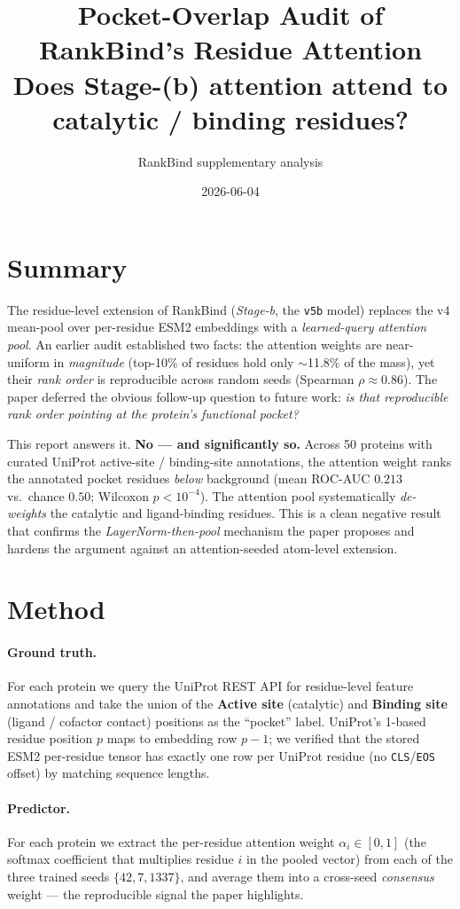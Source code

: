 \documentclass[11pt]{article}
\title{\textbf{Pocket-Overlap Audit of RankBind's Residue Attention}\\[2pt]
\large Does Stage-(b) attention attend to catalytic / binding residues?}
\author{RankBind supplementary analysis}
\date{2026-06-04}
\begin{document}
\maketitle

\section*{Summary}

The residue-level extension of RankBind (\emph{Stage-b}, the \texttt{v5b}
model) replaces the v4 mean-pool over per-residue ESM2 embeddings with a
\emph{learned-query attention pool}. An earlier audit established two facts:
the attention weights are near-uniform in \emph{magnitude} (top-10\% of
residues hold only $\sim$11.8\% of the mass), yet their \emph{rank order} is
reproducible across random seeds (Spearman $\rho \approx 0.86$). The paper
deferred the obvious follow-up question to future work:
\emph{is that reproducible rank order pointing at the protein's functional
pocket?}

This report answers it. \textbf{No --- and significantly so.} Across 50
proteins with curated UniProt active-site / binding-site annotations, the
attention weight ranks the annotated pocket residues \emph{below} background
(mean ROC-AUC $0.213$ vs.\ chance $0.50$; Wilcoxon $p < 10^{-4}$). The
attention pool systematically \emph{de-weights} the catalytic and
ligand-binding residues. This is a clean negative result that confirms the
\emph{LayerNorm-then-pool} mechanism the paper proposes and hardens the
argument against an attention-seeded atom-level extension.

\section{Method}

\paragraph{Ground truth.} For each protein we query the UniProt REST API for
residue-level feature annotations and take the union of the
\textbf{Active site} (catalytic) and \textbf{Binding site}
(ligand / cofactor contact) positions as the ``pocket'' label. UniProt's
1-based residue position $p$ maps to embedding row $p-1$; we verified that the
stored ESM2 per-residue tensor has exactly one row per UniProt residue (no
\texttt{CLS}/\texttt{EOS} offset) by matching sequence lengths.

\paragraph{Predictor.} For each protein we extract the per-residue attention
weight $\alpha_i \in [0,1]$ (the softmax coefficient that multiplies residue
$i$ in the pooled vector) from each of the three trained seeds
$\{42, 7, 1337\}$, and average them into a cross-seed \emph{consensus} weight
--- the reproducible signal the paper highlights.
\end{document}
